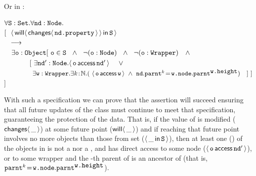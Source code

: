 Or in \Chainmail:

%
%
\vspace{.1cm}

\noindent
$\forall {\mbox{\tt{S}}}:{\mbox{\tt{Set}}}.\forall {\mbox{\tt{nd}}}:{\mbox{\tt{Node}}}.$\\
$[\ \ {\langle\, {\mathsf{will}}\langle \,{\mathsf{changes}}\langle\,{\mbox{\tt{nd.property}}}\,\rangle\,\rangle\, \mathsf{in}\, {\mbox{\tt{S}}}\, \rangle}$ \\
$\strut  \ \ \longrightarrow$\\
$\strut \ \ \ \exists {\mbox{\tt{o}}}:{\mbox{\tt{Object}}}[\ {\mbox{\tt{o}}}\in{\mbox{\tt{S}}}\ \ \wedge\ \ \neg({\mbox{\tt{o}}}:{\mbox{\tt{Node}}})\ \ \wedge\  \ \neg({\mbox{\tt{o}}}:{\mbox{\tt{Wrapper}}})\ \ \ \wedge \  $\\
$ \strut\ \ \  \ \ \ \ \ \ \ \ [\ \exists {\mbox{\tt{nd}}}':{\mbox{\tt{Node}}}. \langle\, {\mbox{\tt{o}}}\, \mathsf{access}\, {\mbox{\tt{nd}}}'\, \rangle\  \ \ \  \vee$\\
$ \strut\ \  \ \  \ \  \ \ \ \ \ \ \ \exists {\mbox{\tt{w}}}:{\mbox{\tt{Wrapper}}}.\exists k\!:\!\mathbb{N}.
  (\ \langle\, {\mbox{\tt{o}}}\, \mathsf{access}\, {\mbox{\tt{w}}}\, \rangle  \ \wedge\ {\mbox{\tt{nd}}}.{\mbox{\tt{parnt}}}^k\!=\!{\mbox{\tt{w.node}}}.{\mbox{\tt{parnt}}}^{{\mbox{\tt{w.height}}}}) \ \ \ ]\ ]$\\
$ ]$

\vspace{.1cm}
With such a specification we can prove that the assertion 
will succeed ensuring that all future updates of
the  class must continue to meet that specification,
guaranteeing the protection
of the  data. 
That is, if the value of  is modified
(${\mathsf{changes}}\langle\,\_\,\rangle$) at some future point (${\mathsf{will}}\langle \,\_\,\rangle$) and if reaching
that future point involves no more objects than those from set 
(\ie ${\langle\, \_\, \mathsf{in}\, {\mbox{\tt{S}}}\, \rangle}$), then at least one () of the
objects in  is not a  nor a ,
and  has direct access to some node
($\langle\, {\mbox{\tt{o}}}\, \mathsf{access}\, {\mbox{\tt{nd}}}'\, \rangle$), or to some wrapper  and
the -th parent of  is an ancestor of 
(that is,
${\mbox{\tt{parnt}}}^k\!=\!{\mbox{\tt{w.node}}}.{\mbox{\tt{parnt}}}^{{\mbox{\tt{w.height}}}}$).
 
